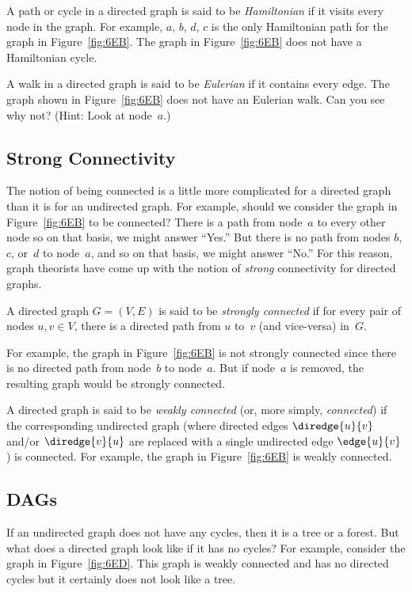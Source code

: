 A path or cycle in a directed graph is said to be \emph{Hamiltonian}
if it visits every node in the graph.  For example, $a$, $b$, $d$, $c$
is the only Hamiltonian path for the graph in Figure~\ref{fig:6EB}.
The graph in Figure~\ref{fig:6EB} does not have a Hamiltonian cycle.

A walk in a directed graph is said to be \emph{Eulerian} if it
contains every edge.  The graph shown in Figure~\ref{fig:6EB} does not
have an Eulerian walk.  Can you see why not?  (Hint: Look at
node~$a$.)

\subsection{Strong Connectivity}

The notion of being connected is a little more complicated for a
directed graph than it is for an undirected graph.  For example,
should we consider the graph in Figure~\ref{fig:6EB} to be connected?
There is a path from node~$a$ to every other node so on that basis, we
might answer ``Yes.''  But there is no path from nodes $b$, $c$,
or~$d$ to node~$a$, and so on that basis, we might answer ``No.''  For
this reason, graph theorists have come up with the notion of
\emph{strong} connectivity for directed graphs.

\begin{definition}
A directed graph $G = (V, E)$ is said to be \emph{strongly connected}
if for every pair of nodes $u, v \in V$, there is a directed path from
$u$ to~$v$ (and vice-versa) in~$G$.
\end{definition}

For example, the graph in Figure~\ref{fig:6EB} is not strongly
connected since there is no directed path from node~$b$ to node~$a$.
But if node~$a$ is removed, the resulting graph would be strongly
connected.

A directed graph is said to be \emph{weakly connected} (or, more
simply, \emph{connected}) if the corresponding undirected graph (where
directed edges $\diredge{u}{v}$ and/or $\diredge{v}{u}$ are replaced
with a single undirected edge $\edge{u}{v}$) is connected.  For example,
the graph in Figure~\ref{fig:6EB} is weakly connected.

\subsection{DAGs}

If an undirected graph does not have any cycles, then it is a tree or
a forest.  But what does a directed graph look like if it has no
cycles?  For example, consider the graph in Figure~\ref{fig:6ED}.
This graph is weakly connected and has no directed cycles but it
certainly does not look like a tree.

